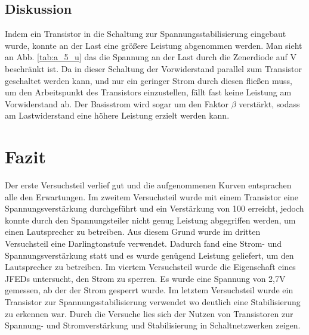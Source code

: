 \documentclass[12pt,a4paper]{article}
\begin{document}
\subsection{Diskussion}
Indem ein Transistor in die Schaltung zur Spannungsstabilisierung eingebaut wurde, konnte an der Last eine größere Leistung abgenommen werden. Man sieht an Abb. \ref{tab:a_5_u} das die Spannung an der Last durch die Zenerdiode auf \unit[5]{V} beschränkt ist. Da in dieser Schaltung der Vorwiderstand parallel zum Transistor geschaltet werden kann, und nur ein geringer Strom durch diesen fließen muss, um den Arbeitspunkt des Transistors einzustellen, fällt fast keine Leistung am Vorwiderstand ab. Der Basisstrom wird sogar um den Faktor $\beta$ verstärkt, sodass am Lastwiderstand eine höhere Leistung erzielt werden kann. 
\section{Fazit}

Der erste Versuchsteil verlief gut und die aufgenommenen Kurven entsprachen alle den Erwartungen. Im zweitem Versuchsteil wurde mit einem Transistor eine Spannungsverstärkung durchgeführt und ein Verstärkung von 100 erreicht, jedoch konnte durch den Spannungsteiler nicht genug Leistung abgegriffen werden, um einen Lautsprecher zu betreiben. Aus diesem Grund wurde im dritten Versuchsteil eine 	Darlingtonstufe verwendet. Dadurch fand eine Strom- und Spannungsverstärkung statt und es wurde genügend Leistung geliefert, um den Lautsprecher zu betreiben. Im viertem Versuchsteil wurde die Eigenschaft eines JFEDs untersucht, den Strom zu sperren. Es wurde eine Spannung von 2,7V gemessen, ab der der Strom gesperrt wurde. Im letztem Versuchsteil wurde ein Transistor zur Spannungsstabilisierung verwendet wo deutlich eine Stabilisierung zu erkennen war.
Durch die Versuche lies sich der Nutzen von Transistoren zur Spannung- und Stromverstärkung und Stabilisierung in Schaltnetzwerken zeigen.
\end{document}
